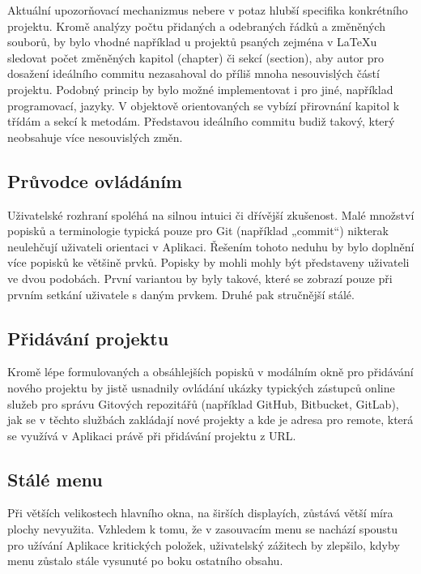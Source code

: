 Aktuální upozorňovací mechanizmus nebere v potaz hlubší specifika konkrétního projektu. Kromě analýzy počtu přidaných a odebraných řádků a změněných souborů, by bylo vhodné například u projektů psaných zejména v \LaTeX{u} sledovat počet změněných kapitol (chapter) či sekcí (section), aby autor pro dosažení ideálního commitu nezasahoval do příliš mnoha nesouvislých částí projektu. Podobný princip by bylo možné implementovat i pro jiné, například programovací, jazyky. V objektově orientovaných se vybízí přirovnání kapitol k třídám a sekcí k metodám. Představou ideálního commitu budiž takový, který neobsahuje více nesouvislých změn.

\subsection{Průvodce ovládáním}

Uživatelské rozhraní spoléhá na silnou intuici či dřívější zkušenost. Malé množství popisků a terminologie typická pouze pro Git (například „commit“) nikterak neulehčují uživateli orientaci v Aplikaci. Řešením tohoto neduhu by bylo doplnění více popisků ke většině prvků. Popisky by mohli mohly být představeny uživateli ve dvou podobách. První variantou by byly takové, které se zobrazí pouze při prvním setkání uživatele s daným prvkem. Druhé pak stručnější stálé.

\subsection{Přidávání projektu}

Kromě lépe formulovaných a obsáhlejších popisků v modálním okně pro přidávání nového projektu by jistě usnadnily ovládání ukázky typických zástupců online služeb pro správu Gitových repozitářů (například GitHub, Bitbucket, GitLab), jak se v těchto službách zakládají nové projekty a kde je adresa pro remote, která se využívá v Aplikaci právě při přidávání projektu z URL.

\subsection{Stálé menu}

Při větších velikostech hlavního okna, na širších displayích, zůstává větší míra plochy nevyužita. Vzhledem k tomu, že v zasouvacím menu se nachází spoustu pro užívání Aplikace kritických položek, uživatelský zážitech by zlepšilo, kdyby menu zůstalo stále vysunuté po boku ostatního obsahu.


